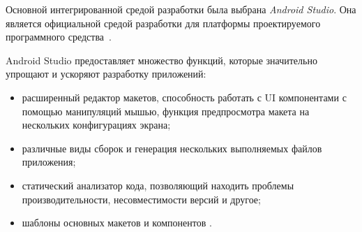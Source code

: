 Основной интегрированной средой разработки была выбрана \emph{Android Studio}. Она является официальной средой разработки для платформы проектируемого программного средства~\cite{android_studio}. 

Android Studio предоставляет множество функций, которые значительно упрощают и ускоряют разработку приложений:
\begin{itemize}
    \item расширенный редактор макетов, способность работать с UI компонентами с помощью манипуляций мышью, функция предпросмотра макета на нескольких конфигурациях экрана;
    \item различные виды сборок и генерация нескольких выполняемых файлов приложения;
    \item статический анализатор кода, позволяющий находить проблемы производительности, несовместимости версий и другое;
    \item шаблоны основных макетов и компонентов \andro.
\end{itemize}